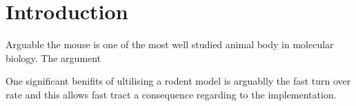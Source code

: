 \section{Introduction}

Arguable the mouse is one of the most well studied animal body in molecular biology. The argument 

One significant benifits of ultilising a rodent model is arguablly the fast turn over rate and this allows fast tract a consequence regarding to the implementation. \cite{Vandamme_2014}